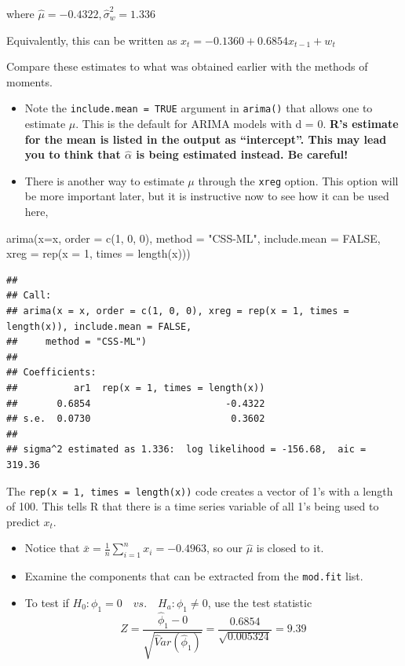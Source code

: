 \documentclass[
]{book}
\newenvironment{Shaded}{\begin{snugshade}}{\end{snugshade}}
\newcommand{\AttributeTok}[1]{\textcolor[rgb]{0.77,0.63,0.00}{#1}}
\newcommand{\ConstantTok}[1]{\textcolor[rgb]{0.00,0.00,0.00}{#1}}
\newcommand{\DecValTok}[1]{\textcolor[rgb]{0.00,0.00,0.81}{#1}}
\newcommand{\FunctionTok}[1]{\textcolor[rgb]{0.00,0.00,0.00}{#1}}
\newcommand{\NormalTok}[1]{#1}
\newcommand{\StringTok}[1]{\textcolor[rgb]{0.31,0.60,0.02}{#1}}
\providecommand{\tightlist}{%
  \setlength{\itemsep}{0pt}\setlength{\parskip}{0pt}}
\theoremstyle{definition}
\theoremstyle{definition}
\theoremstyle{definition}
\theoremstyle{definition}
\theoremstyle{remark}
\begin{document}
where \(\hat \mu=-0.4322, \hat \sigma_w^2=1.336\)

Equivalently, this can be written as \(x_t=-0.1360+0.6854x_{t-1}+w_t\)

Compare these estimates to what was obtained earlier with the methods of moments.

\begin{itemize}
\item
  Note the \texttt{include.mean\ =\ TRUE} argument in \texttt{arima()} that allows one to estimate \(\mu\). This is the default for ARIMA models with d = 0. \textbf{R's estimate for the mean is listed in the output as ``intercept''. This may lead you to think that \(\hat \alpha\) is being estimated instead. Be careful!}
\item
  There is another way to estimate \(\mu\) through the \texttt{xreg} option. This option will be more important later, but it is instructive now to see how it can be used here,
\end{itemize}

\begin{Shaded}
\begin{Highlighting}[]
\FunctionTok{arima}\NormalTok{(}\AttributeTok{x=}\NormalTok{x, }\AttributeTok{order =} \FunctionTok{c}\NormalTok{(}\DecValTok{1}\NormalTok{, }\DecValTok{0}\NormalTok{, }\DecValTok{0}\NormalTok{), }\AttributeTok{method =} \StringTok{"CSS{-}ML"}\NormalTok{, }
    \AttributeTok{include.mean =} \ConstantTok{FALSE}\NormalTok{, }\AttributeTok{xreg =} \FunctionTok{rep}\NormalTok{(}\AttributeTok{x =} \DecValTok{1}\NormalTok{, }\AttributeTok{times =} 
    \FunctionTok{length}\NormalTok{(x)))}
\end{Highlighting}
\end{Shaded}

\begin{verbatim}
## 
## Call:
## arima(x = x, order = c(1, 0, 0), xreg = rep(x = 1, times = length(x)), include.mean = FALSE, 
##     method = "CSS-ML")
## 
## Coefficients:
##          ar1  rep(x = 1, times = length(x))
##       0.6854                        -0.4322
## s.e.  0.0730                         0.3602
## 
## sigma^2 estimated as 1.336:  log likelihood = -156.68,  aic = 319.36
\end{verbatim}

The \texttt{rep(x\ =\ 1,\ times\ =\ length(x))} code creates a vector of 1's with a length of 100. This tells R that there is a time series variable of all 1's being used to predict \(x_t\).

\begin{itemize}
\tightlist
\item
  Notice that \(\bar x=\frac{1}{n}\sum_{i=1}^{n}x_i=-0.4963\), so our \(\hat \mu\) is closed to it.
\item
  Examine the components that can be extracted from the \texttt{mod.fit} list.
\item
  To test if \(H_0:\phi_1 = 0\quad vs. \quad H_a:\phi_1 \ne 0\), use the test statistic \[Z=\frac{\hat \phi_1-0}{\sqrt{ \hat Var(\hat \phi_1)}}=\frac{0.6854}{\sqrt{0.005324}}=9.39\]
\end{itemize}
\end{document}

